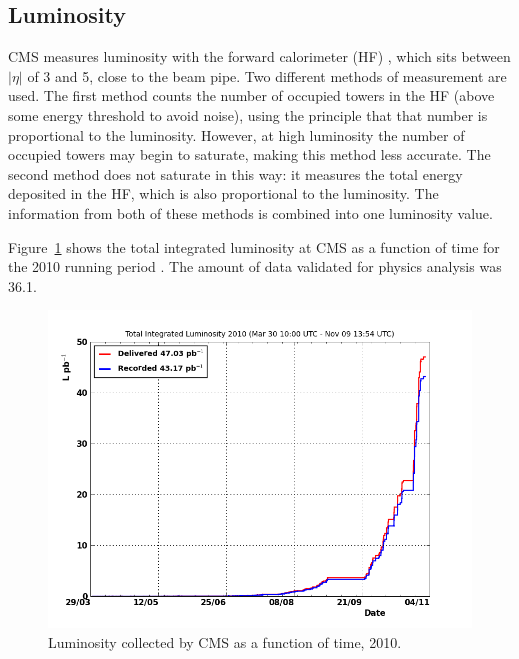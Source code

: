 \subsection{Luminosity}
\label{exp:lumi}

CMS measures luminosity with the forward calorimeter (HF) \cite{CMS-PAS-EWK-10-004}, 
which sits 
between $|\eta|$ of 3 and 5, close to the beam pipe.  
Two different methods of measurement are used.  
The first method counts the number of occupied towers in the HF 
(above some energy threshold to avoid noise), 
using the principle that that number is proportional to the luminosity.  
However, at high luminosity the number of occupied towers may begin to 
saturate, making this method less accurate.  
The second method does not saturate in this way: 
it measures the total energy deposited in the HF, 
which is also proportional to the luminosity.  
The information from both of these methods is combined into one 
luminosity value.  

Figure~\ref{fig:LuminosityVsTime} shows the total integrated luminosity at CMS 
as a function of time for the 2010 running period \cite{LumiPublicResults2010}.  
The amount of data validated for physics analysis was 
36.1\pb.  

 \begin{figure}[htb]
  \begin{center}
    \includegraphics[width=360pt]{Figures/totallumivstime2010.png}
  \end{center}
  \caption[\fixspacing Luminosity collected by CMS as a function of time, 2010]
	  {\fixspacing Luminosity collected by CMS as a function of time, 2010.}
  \label{fig:LuminosityVsTime}
 \end{figure}


